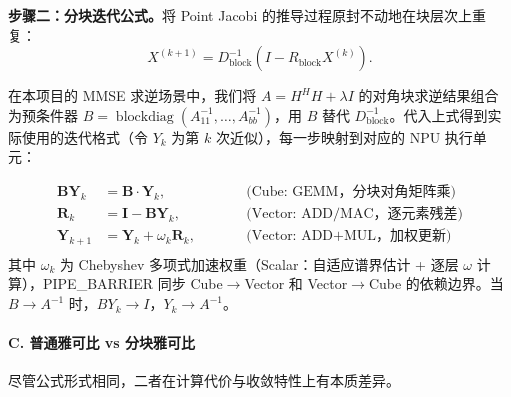\documentclass{CjC}
\begin{document}
    \textbf{步骤二：分块迭代公式。}将 Point Jacobi 的推导过程原封不动地在块层次上重复：
    \begin{equation}
        \boxed{X^{(k+1)} = D_{\text{block}}^{-1}(I - R_{\text{block}} X^{(k)})}.
    \end{equation}

    在本项目的 MMSE 求逆场景中，我们将 $A = H^{H}H + \lambda I$
    的对角块求逆结果组合为预条件器
    $B = \operatorname{blockdiag}(A_{11}^{-1}, \dots, A_{bb}^{-1})$，用 $B$ 替代
    $D_{\text{block}}^{-1}$。代入上式得到实际使用的迭代格式（令 $Y_{k}$ 为第 $k$
    次近似），每一步映射到对应的 NPU 执行单元：

    \begin{equation}
        \boxed{ \begin{aligned}\bm{B}\bm{Y}_{k}&= \bm{B}\cdot \bm{Y}_{k}, \qquad&&\text{(Cube: GEMM，分块对角矩阵乘)}\\ \bm{R}_{k}&= \bm{I}- \bm{B}\bm{Y}_{k}, \qquad&&\text{(Vector: ADD/MAC，逐元素残差)}\\ \bm{Y}_{k+1}&= \bm{Y}_{k}+ \omega_{k}\bm{R}_{k}, \qquad&&\text{(Vector: ADD+MUL，加权更新)}\\\end{aligned}}
        \label{eq:bri-iter}
    \end{equation}
    其中 $\omega_{k}$ 为 Chebyshev 多项式加速权重（Scalar：自适应谱界估计 + 逐层
    $\omega$ 计算），PIPE\_BARRIER 同步 Cube$\rightarrow$Vector 和 Vector$\rightarrow$Cube
    的依赖边界。当 $B \to A^{-1}$ 时，$BY_{k}\to I$，$Y_{k}\to A^{-1}$。

    \paragraph{C. 普通雅可比 vs 分块雅可比}

    尽管公式形式相同，二者在计算代价与收敛特性上有本质差异。
\end{document}
